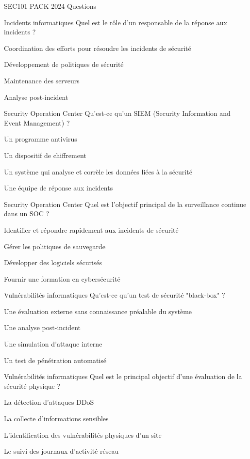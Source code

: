 \documentclass[12pt]{article}
\begin{document}
\begin{quiz}{SEC101 PACK 2024 Questions}
\begin{multi}[points=1]{Incidents informatiques}
Quel est le rôle d'un responsable de la réponse aux incidents ?
     \item *Coordination des efforts pour résoudre les incidents de sécurité
    \item Développement de politiques de sécurité
    \item Maintenance des serveurs
    \item Analyse post-incident
\end{multi}

\begin{multi}[points=1]{Security Operation Center}
Qu'est-ce qu'un SIEM (Security Information and Event Management) ?
    \item Un programme antivirus
    \item Un dispositif de chiffrement
    \item *Un système qui analyse et corrèle les données liées à la sécurité
    \item Une équipe de réponse aux incidents
\end{multi}

\begin{multi}[points=1]{Security Operation Center}
Quel est l'objectif principal de la surveillance continue dans un SOC ?
    \item *Identifier et répondre rapidement aux incidents de sécurité
    \item Gérer les politiques de sauvegarde
    \item Développer des logiciels sécurisés
    \item Fournir une formation en cybersécurité
\end{multi}

\begin{multi}[points=1]{Vulnérabilités informatiques}
Qu'est-ce qu'un test de sécurité "black-box" ?
    \item *Une évaluation externe sans connaissance préalable du système
    \item Une analyse post-incident
    \item Une simulation d'attaque interne
    \item Un test de pénétration automatisé
\end{multi}

\begin{multi}[points=1]{Vulnérabilités informatiques}
Quel est le principal objectif d'une évaluation de la sécurité physique ?
    \item La détection d'attaques DDoS
    \item La collecte d'informations sensibles
    \item *L'identification des vulnérabilités physiques d'un site
    \item Le suivi des journaux d'activité réseau
\end{multi}


\end{quiz}
\end{document}
